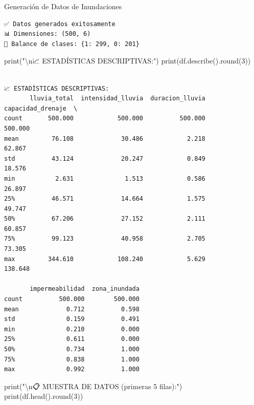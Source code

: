 \documentclass[
  ignorenonframetext,
]{beamer}
\newenvironment{Shaded}{\begin{snugshade}}{\end{snugshade}}
\newcommand{\BuiltInTok}[1]{\textcolor[rgb]{0.00,0.23,0.31}{#1}}
\newcommand{\CharTok}[1]{\textcolor[rgb]{0.13,0.47,0.30}{#1}}
\newcommand{\DecValTok}[1]{\textcolor[rgb]{0.68,0.00,0.00}{#1}}
\newcommand{\NormalTok}[1]{\textcolor[rgb]{0.00,0.23,0.31}{#1}}
\newcommand{\StringTok}[1]{\textcolor[rgb]{0.13,0.47,0.30}{#1}}
\begin{document}
\begin{frame}[fragile]{Generación de Datos de Inundaciones}
\begin{verbatim}
✅ Datos generados exitosamente
📊 Dimensiones: (500, 6)
🎯 Balance de clases: {1: 299, 0: 201}
\end{verbatim}

\label{stats-datos}
\begin{Shaded}
\begin{Highlighting}[]
\BuiltInTok{print}\NormalTok{(}\StringTok{"}\CharTok{\textbackslash{}n}\StringTok{📈 ESTADÍSTICAS DESCRIPTIVAS:"}\NormalTok{)}
\BuiltInTok{print}\NormalTok{(df.describe().}\BuiltInTok{round}\NormalTok{(}\DecValTok{3}\NormalTok{))}
\end{Highlighting}
\end{Shaded}

\begin{verbatim}

📈 ESTADÍSTICAS DESCRIPTIVAS:
       lluvia_total  intensidad_lluvia  duracion_lluvia  capacidad_drenaje  \
count       500.000            500.000          500.000            500.000   
mean         76.108             30.486            2.218             62.867   
std          43.124             20.247            0.849             18.576   
min           2.631              1.513            0.586             26.897   
25%          46.571             14.664            1.575             49.747   
50%          67.206             27.152            2.111             60.857   
75%          99.123             40.958            2.705             73.305   
max         344.610            108.240            5.629            138.648   

       impermeabilidad  zona_inundada  
count          500.000        500.000  
mean             0.712          0.598  
std              0.159          0.491  
min              0.210          0.000  
25%              0.611          0.000  
50%              0.734          1.000  
75%              0.838          1.000  
max              0.992          1.000  
\end{verbatim}

\label{head-datos}
\begin{Shaded}
\begin{Highlighting}[]
\BuiltInTok{print}\NormalTok{(}\StringTok{"}\CharTok{\textbackslash{}n}\StringTok{📋 MUESTRA DE DATOS (primeras 5 filas):"}\NormalTok{)}
\BuiltInTok{print}\NormalTok{(df.head().}\BuiltInTok{round}\NormalTok{(}\DecValTok{3}\NormalTok{))}
\end{Highlighting}
\end{Shaded}


\end{frame}
\end{document}
